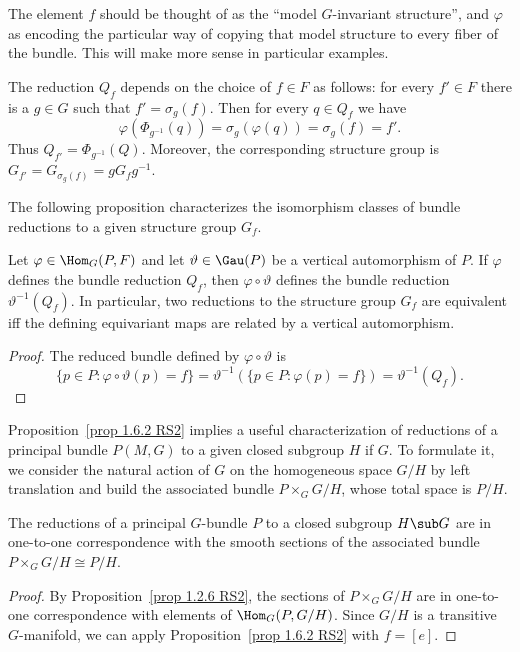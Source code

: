 The element $f$ should be thought of as the ``model $G$-invariant structure'', and $\varphi$ as encoding the particular way of copying that model structure to every fiber of the bundle. This will make more sense in particular examples.

\begin{rem}[{{\cite[Rem.~1.6.3]{RS2}}}]
    The reduction $Q_f$ depends on the choice of $f\in F$ as follows: for every $f'\in F$ there is a $g\in G$ such that $f'=\sigma_g(f)$. Then for every $q\in Q_f$ we have
    \[\varphi(\Phi_{g^{-1}}(q))=\sigma_g(\varphi(q))=\sigma_g(f)=f'.\]
    Thus $Q_{f'}=\Phi_{g^{-1}}(Q)$. Moreover, the corresponding structure group is $G_{f'}=G_{\sigma_g(f)}=gG_fg^{-1}$.
\end{rem}


The following proposition characterizes the isomorphism classes of bundle reductions to a given structure group $G_f$.

\begin{prop}[{{\cite[Prop.~1.6.4]{RS2}}}]\label{prop 1.6.4 RS2}
    Let $\varphi\in \Hom_G(P,F)$ and let $\vartheta\in\Gau(P)$ be a vertical automorphism of $P$. If $\varphi$ defines the bundle reduction $Q_f$, then $\varphi\circ\vartheta$ defines the bundle reduction $\vartheta^{-1}(Q_f)$. In particular, two reductions to the structure group $G_f$ are equivalent iff the defining equivariant maps are related by a vertical automorphism.
\end{prop}
\begin{proof}
    The reduced bundle defined by $\varphi\circ\vartheta$ is
    \[\{p\in P:\varphi\circ\vartheta(p)=f\}=\vartheta^{-1}\left(\{p\in P:\varphi(p)=f\}\right)=\vartheta^{-1}(Q_f).\]
\end{proof}

Proposition~\ref{prop 1.6.2 RS2} implies a useful characterization of reductions of a principal bundle $P(M,G)$ to a given closed subgroup $H$ if $G$. To formulate it, we consider the natural action of $G$ on the homogeneous space $G\slash H$ by left translation and build the associated bundle $P\times_G G\slash H$, whose total space is $P\slash H$.

\begin{cor}[{{\cite[Cor.~1.6.5]{RS2}}}]\label{cor 1.6.5 RS2}
    The reductions of a principal $G$-bundle $P$ to a closed subgroup $H\sub G$ are in one-to-one correspondence with the smooth sections of the associated bundle $P\times_G G\slash H\cong P\slash H$.
\end{cor}
\begin{proof}
    By Proposition~\ref{prop 1.2.6 RS2}, the sections of $P\times_G G\slash H$ are in one-to-one correspondence with elements of $\Hom_G(P,G\slash H)$. Since $G\slash H$ is a transitive $G$-manifold, we can apply Proposition~\ref{prop 1.6.2 RS2} with $f=[e]$.
\end{proof}

